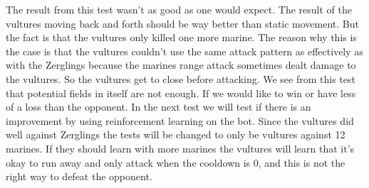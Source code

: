 The result from this test wasn't as good as one would expect. The result of the vultures moving back and forth should be way better than static movement. But the fact is that the vultures only killed one more marine. The reason why this is the case is that the vultures couldn't use the same attack pattern as effectively as with the Zerglings because the marines range attack sometimes dealt damage to the vultures. So the vultures get to close before attacking.
We see from this test that potential fields in itself are not enough. If we would like to win or have less of a loss than the opponent. In the next test we will test if there is an improvement by using reinforcement learning on the bot. Since the vultures did well against Zerglings the tests will be changed to only be vultures against 12 marines. If they should learn with more marines the vultures will learn that it's okay to run away and only attack when the cooldown is 0, and this is not the right way to defeat the opponent.




